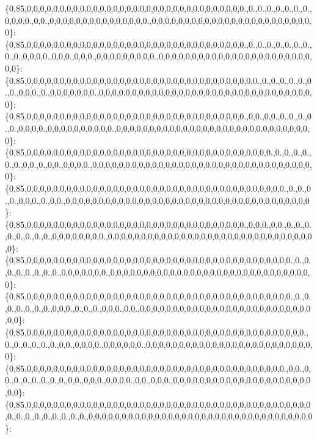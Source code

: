 \{0,85,0,0,0,0,0,0,0,0,0,0,0,0,0,0,0,0,0,0,0,0,0,0,0,0,0,0,0,0,0,0,0,0,0.,0.,0.,0.,0.,0.,0.,0.,0,0,0,0.,0,0.,0,0,0,0,0,0,0,0,0,0,0,0,0,0,0.,0,0,0,0,0,0,0,0,0,0,0,0,0,0,0,0,0,0,0,0,0,0,0,0,0\}\+: \{0,85,0,0,0,0,0,0,0,0,0,0,0,0,0,0,0,0,0,0,0,0,0,0,0,0,0,0,0,0,0,0,0,0,0.,0.,0.,0.,0.,0.,0.,0.,0.,0.,0,0,0,0.,0,0,0.,0,0,0.,0,0,0,0,0,0,0,0,0.,0,0,0,0,0,0,0,0,0,0,0,0,0,0,0,0,0,0,0,0,0,0,0,0,0\}\+: \{0,85,0,0,0,0,0,0,0,0,0,0,0,0,0,0,0,0,0,0,0,0,0,0,0,0,0,0,0,0,0,0,0,0,0,0,0.,0.,0.,0.,0.,0.,0.,0.,0,0,0.,0.,0,0,0,0,0,0,0.,0,0,0,0,0,0,0,0,0,0,0,0,0,0,0,0,0,0,0,0,0,0,0,0,0,0,0,0,0,0,0,0,0\}\+: \{0,85,0,0,0,0,0,0,0,0,0,0,0,0,0,0,0,0,0,0,0,0,0,0,0,0,0,0,0,0,0,0,0,0,0.,0,0.,0,0.,0.,0.,0.,0.,0.,0,0,0,0.,0,0,0,0,0,0,0,0,0,0.,0,0,0,0,0,0,0,0,0,0,0,0,0,0,0,0,0,0,0,0,0,0,0,0,0,0,0,0,0,0\}\+: \{0,85,0,0,0,0,0,0,0,0,0,0,0,0,0,0,0,0,0,0,0,0,0,0,0,0,0,0,0,0,0,0,0,0,0,0,0,0,0.,0.,0.,0.,0.,0.,0.,0,0.,0.,0,0.,0,0,0,0.,0,0,0,0,0,0,0,0,0,0,0,0,0,0,0,0,0,0,0,0,0,0,0,0,0,0,0,0,0,0,0,0,0,0\}\+: \{0,85,0,0,0,0,0,0,0,0,0,0,0,0,0,0,0,0,0,0,0,0,0,0,0,0,0,0,0,0,0,0,0,0,0,0,0,0,0,0,0.,0.,0.,0.,0.,0,0,0.,0.,0,0.,0,0,0,0,0,0,0,0,0,0,0,0,0,0,0,0,0,0,0,0,0,0,0,0,0,0,0,0,0,0,0,0,0,0,0,0,0\}\+: \{0,85,0,0,0,0,0,0,0,0,0,0,0,0,0,0,0,0,0,0,0,0,0,0,0,0,0,0,0,0,0,0,0,0,0.,0,0,0.,0,0.,0.,0.,0.,0.,0.,0.,0.,0.,0,0,0,0,0,0,0,0.,0,0,0,0,0,0,0,0,0,0,0,0,0,0,0,0,0,0,0,0,0,0,0,0,0,0,0,0,0,0,0,0\}\+: \{0,85,0,0,0,0,0,0,0,0,0,0,0,0,0,0,0,0,0,0,0,0,0,0,0,0,0,0,0,0,0,0,0,0,0,0,0,0,0,0,0,0.,0.,0.,0.,0.,0.,0.,0.,0.,0,0,0,0,0,0,0.,0,0,0,0,0,0,0,0,0,0,0,0,0,0,0,0,0,0,0,0,0,0,0,0,0,0,0,0,0,0,0\}\+: \{0,85,0,0,0,0,0,0,0,0,0,0,0,0,0,0,0,0,0,0,0,0,0,0,0,0,0,0,0,0,0,0,0,0,0,0,0,0,0,0,0,0.,0.,0.,0.,0.,0.,0.,0.,0,0,0.,0.,0.,0.,0,0,0.,0,0.,0,0,0,0,0,0,0,0,0,0,0,0,0,0,0,0,0,0,0,0,0,0,0,0,0,0,0,0\}\+: \{0,85,0,0,0,0,0,0,0,0,0,0,0,0,0,0,0,0,0,0,0,0,0,0,0,0,0,0,0,0,0,0,0,0,0,0,0,0,0,0,0,0,0,0.,0.,0.,0.,0.,0.,0.,0,0.,0,0,0,0.,0,0,0,0,0,0.,0,0,0,0,0,0,0,0,0,0,0,0,0,0,0,0,0,0,0,0,0,0,0,0,0,0\}\+: \{0,85,0,0,0,0,0,0,0,0,0,0,0,0,0,0,0,0,0,0,0,0,0,0,0,0,0,0,0,0,0,0,0,0,0,0,0,0,0,0,0.,0,0.,0,0.,0.,0.,0.,0.,0.,0.,0,0.,0,0,0.,0,0,0,0.,0,0.,0,0,0.,0,0,0,0,0,0,0,0,0,0,0,0,0,0,0,0,0,0,0,0,0,0,0\}\+: \{0,85,0,0,0,0,0,0,0,0,0,0,0,0,0,0,0,0,0,0,0,0,0,0,0,0,0,0,0,0,0,0,0,0,0,0,0,0,0,0,0,0,0,0,0,0.,0.,0.,0.,0.,0.,0.,0.,0.,0,0,0,0,0,0,0,0,0,0,0,0,0,0,0,0,0,0,0,0,0,0,0,0,0,0,0,0,0,0,0,0,0,0\}\+: 